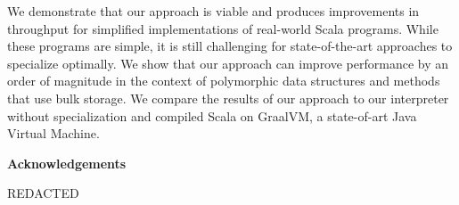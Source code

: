 We demonstrate that our approach is viable and produces improvements in throughput for simplified implementations of real-world Scala programs.
While these programs are simple, it is still challenging for state-of-the-art approaches to specialize optimally.
We show that our approach can improve performance by an order of magnitude in the context of polymorphic data structures and methods that use bulk storage.
We compare the results of our approach to our interpreter without specialization and compiled Scala on GraalVM, a state-of-art Java Virtual Machine.

\cleardoublepage


\begin{center}\textbf{Acknowledgements}\end{center}

REDACTED
\cleardoublepage

\renewcommand\contentsname{Table of Contents}
\tableofcontents
\cleardoublepage
{}    %

\listoftables
\cleardoublepage
{}		%

\listoffigures
\cleardoublepage
{}		%

\printglossaries
\cleardoublepage
{}		%


